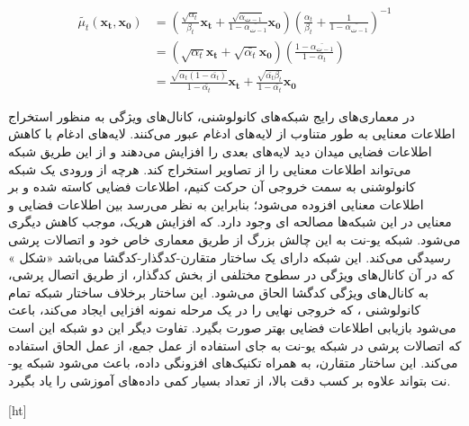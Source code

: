 \begin{equation}
	\begin{aligned}
		\tilde{\mu_t}(\mathbf{x_t}, \mathbf{x_0}) &= \left( \frac{\sqrt{\alpha_t}}{\beta_t} \mathbf{x_t} + \frac{\sqrt{\bar{\alpha_{ت-1}}}}{1 - \bar{\alpha_{ت-1}}} \mathbf{x_0} \right) \left( \frac{\alpha_t}{\beta_t} + \frac{1}{1 - \bar{\alpha_{ت-1}}} \right)^{-1} \\
		&= \left( \sqrt{\alpha_t} \mathbf{x_t} + \sqrt{\bar{\alpha_t}} \mathbf{x_0} \right) \left( \frac{1 - \bar{\alpha_{ت-1}}}{1 - \bar{\alpha_t}} \right) \\
		&= \frac{\sqrt{\alpha_t (1 - \bar{\alpha_t})}}{1 - \bar{\alpha_t}} \mathbf{x_t} + \frac{\sqrt{\bar{\alpha_t} \beta_t}}{1 - \bar{\alpha_t}} \mathbf{x_0}
	\end{aligned}
\end{equation}





در معماری‌های رایج شبکه‌های کانولوشنی، کانال‌های ویژگی به منظور استخراج اطلاعات معنایی به طور متناوب از لایه‌های ادغام عبور می‌کنند. لایه‌های ادغام با کاهش اطلاعات فضایی میدان دید لایه‌های بعدی را افزایش می‌دهند و از این طریق شبکه می‌تواند اطلاعات معنایی را از تصاویر استخراج کند. هرچه از ورودی یک شبکه کانولوشنی به سمت خروجی آن حرکت کنیم، اطلاعات فضایی کاسته شده و بر اطلاعات معنایی افزوده می‌شود؛ بنابراین به نظر می‌رسد بین اطلاعات فضایی و معنایی در این شبکه‌ها مصالحه ای وجود دارد. که افزایش هریک، موجب کاهش دیگری می‌شود. شبکه یو-نت به این چالش بزرگ از طریق معماری خاص خود و اتصالات پرشی رسیدگی می‌کند. این شبکه دارای یک ساختار متقارن-کدگذار-کدگشا می‌باشد «شکل » که در آن کانال‌های ویژگی در سطوح مختلفی از بخش کدگذار، از طریق اتصال پرشی، به کانال‌های ویژگی کدگشا الحاق می‌شود. این ساختار برخلاف ساختار شبکه تمام کانولوشنی ، که خروجی نهایی را در یک مرحله نمونه افزایی ایجاد می‌کند، باعث می‌شود بازیابی اطلاعات فضایی بهتر صورت بگیرد. تفاوت دیگر این دو شبکه این است که اتصالات پرشی در شبکه یو-نت به جای استفاده از عمل جمع، از عمل الحاق استفاده می‌کند. این ساختار متقارن، به همراه تکنیک‌های افزونگی داده، باعث می‌شود شبکه یو-نت بتواند علاوه بر کسب دقت بالا، از تعداد بسیار کمی داده‌های آموزشی را یاد بگیرد.


[ht]







